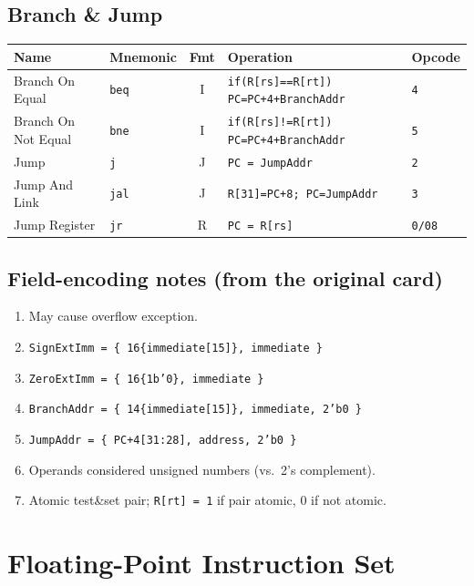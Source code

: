 \documentclass[10pt]{article}
\newcommand{\op}[1]{\texttt{#1}}
\begin{document}
\subsection{Branch \& Jump}
\begin{center}
\small
\begin{tabular}{@{}p{3.1cm}p{1.6cm}cp{6.1cm}l@{}}
\toprule
Name & Mnemonic & Fmt & Operation & Opcode \\
\midrule
Branch On Equal     & \op{beq} & I & \op{if(R[rs]==R[rt]) PC=PC+4+BranchAddr} & \op{4} \\
Branch On Not Equal & \op{bne} & I & \op{if(R[rs]!=R[rt]) PC=PC+4+BranchAddr} & \op{5} \\
Jump                & \op{j}   & J & \op{PC = JumpAddr} & \op{2} \\
Jump And Link       & \op{jal} & J & \op{R[31]=PC+8; PC=JumpAddr} & \op{3} \\
Jump Register       & \op{jr}  & R & \op{PC = R[rs]} & \op{0/08} \\
\bottomrule
\end{tabular}
\end{center}

\subsection{Field-encoding notes (from the original card)}
\begin{enumerate}[label=(\arabic*)]
  \item May cause overflow exception.
  \item \op{SignExtImm = \{ 16\{immediate[15]\}, immediate \}}
  \item \op{ZeroExtImm = \{ 16\{1b'0\}, immediate \}}
  \item \op{BranchAddr = \{ 14\{immediate[15]\}, immediate, 2'b0 \}}
  \item \op{JumpAddr = \{ PC+4[31:28], address, 2'b0 \}}
  \item Operands considered unsigned numbers (vs.\ 2's complement).
  \item Atomic test\&set pair; \op{R[rt] = 1} if pair atomic, 0 if not
  atomic.
\end{enumerate}

\section{Floating-Point Instruction Set}
\end{document}
